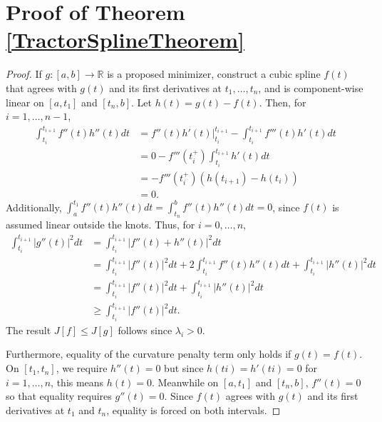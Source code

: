 \section{Proof of Theorem \ref{TractorSplineTheorem}}\label{AppendixTractorSplineProof}

\begin{proof}
If $g:[a,b]\to \mathbb{R}$ is a proposed minimizer, construct a cubic spline $f(t)$ that agrees with $g(t)$ and its first derivatives at $t_1,\ldots,t_n$, and is component-wise linear on $[a, t_1]$ and $[t_n, b]$. Let $h(t) = g(t)-f(t)$. Then, for $i = 1,\dots ,n-1$, 
\begin{align*}
\int_{t_i}^{t_{i+1}}f''(t)h''(t)dt &=f''(t)h'(t) \bigg\rvert_{t_i}^{t_{i+1}}-\int_{t_i}^{t_{i+1}}f'''(t)h'(t)dt \\
&= 0-f'''(t_i^+)\int_{t_i}^{t_{i+1}}h'(t)dt \\
&= -f'''(t_i^+)\left( h(t_{i+1}) -h(t_i) \right)\\
&=0.
\end{align*}
Additionally, $\int_{a}^{t_1}f''(t)h''(t)dt=\int_{t_n}^{b}f''(t)h''(t)dt=0$, since $f(t)$ is assumed linear outside the knots. Thus, for $i=0,\ldots,n$, 
\begin{align*}
\int_{t_i}^{t_{i+1}}\lvert g''(t) \rvert^2dt &= \int_{t_i}^{t_{i+1}}\lvert f''(t)+h''(t)\rvert^2 dt\\
&= \int_{t_i}^{t_{i+1}}\lvert f''(t)\rvert^2dt+2\int_{t_i}^{t_{i+1}}f''(t)h''(t)dt+\int_{t_i}^{t_{i+1}}\lvert h''(t)\rvert^2dt\\
&=\int_{t_i}^{t_{i+1}}\lvert f''(t)\rvert^2dt+\int_{t_i}^{t_{i+1}}\lvert h''(t)\rvert^2dt\\
&\geq \int_{t_i}^{t_{i+1}}\lvert f''(t)\rvert^2dt.
\end{align*}
The result $J[f]\leq J[g]$ follows since $\lambda_i>0$. 

Furthermore, equality of the curvature penalty term only holds if $g(t) = f(t)$. On $[t_1, t_n]$, we require $h''(t) = 0$ but since $h(ti) = h'(ti) = 0$ for $i = 1, \ldots , n$, this means $h(t) = 0$. Meanwhile on $[a, t_1]$ and $[t_n, b]$, $f''(t) = 0$ so that equality requires $g''(t)=0$. Since $f(t)$ agrees with $g(t)$ and its first derivatives at $t_1$ and $t_n$, equality is forced on both intervals.
\end{proof}

